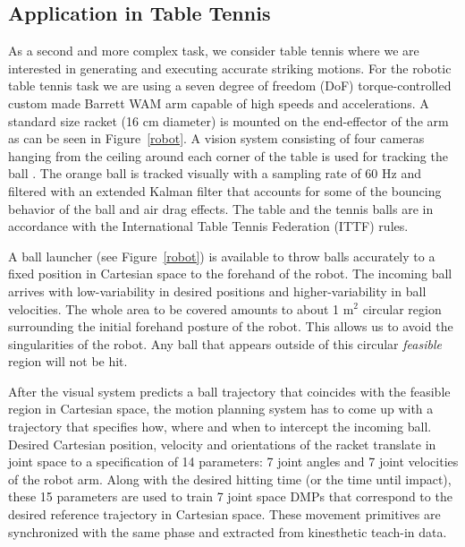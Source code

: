 \subsection{Application in Table Tennis}

As a second and more complex task, we consider table tennis where we are interested in generating and executing accurate striking motions. For the robotic table tennis task we are using a seven degree of freedom (DoF) torque-controlled custom made Barrett WAM arm capable of high speeds and accelerations. A standard size racket (16 cm diameter) is mounted on the end-effector of the arm as can be seen in Figure~\ref{robot}. A vision system consisting of four cameras hanging from the ceiling around each corner of the table is used for tracking the ball \cite{Lampert12}. The orange ball is tracked  visually with a sampling rate of 60 Hz and filtered with an extended Kalman filter that accounts for some of the bouncing behavior of the ball and air drag effects. The table and the tennis balls are in accordance with the International Table Tennis Federation (ITTF) rules.

A ball launcher (see Figure~\ref{robot}) is available to throw balls accurately to a fixed position in Cartesian space to the forehand of the robot. The incoming ball arrives with low-variability in desired positions and higher-variability in ball velocities. The whole area to be covered amounts to about 1 m$^2$ circular region surrounding the initial forehand posture of the robot. This allows us to avoid the singularities of the robot. Any ball that appears outside of this circular \emph{feasible} region will not be hit.

After the visual system predicts a ball trajectory that coincides with the feasible region in Cartesian space, the motion planning system has to come up with a trajectory that specifies how, where and when to intercept the incoming ball. Desired Cartesian position, velocity and orientations of the racket translate in joint space to a specification of 14 parameters: 7 joint angles and 7 joint velocities of the robot arm. Along with the desired hitting time (or the time until impact), these 15 parameters are used to train 7 joint space DMPs that correspond to the desired reference trajectory in Cartesian space. These movement primitives are synchronized with the same phase and extracted from kinesthetic teach-in data.

